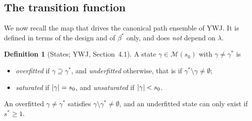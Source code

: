 \documentclass[aos]{imsart}
\DeclarePairedDelimiter{\abs}{\lvert}{\rvert}
\theoremstyle{plain}
\theoremstyle{definition}
\newtheorem{definition}{Definition}[section]
\begin{document}
    \subsection{The transition function}
    \label{sec:G}


    We now recall the map that drives the canonical path ensemble of YWJ. It
    is defined in terms of the design and of $\beta^\ast$ only, and does
    \emph{not} depend on $\lambda$.

    \begin{definition}[States; YWJ, Section~4.1]
        \label{def:states}
        A state $\gamma\in\mathscr{M}(s_0)$ with $\gamma\neq\gamma^{\ast}$ is
        \begin{itemize}[noitemsep,leftmargin=2.2em]
            \item \emph{overfitted} if $\gamma\supseteq\gamma^{\ast}$, and
            \emph{underfitted} otherwise, that is if
            $\gamma^{\ast}\setminus\gamma\neq\emptyset$;
            \item \emph{saturated} if $\abs \gamma=s_0$, and
            \emph{unsaturated} if $\abs \gamma<s_0$.
        \end{itemize}
        An overfitted $\gamma\neq\gamma^\ast$ satisfies
        $\gamma\setminus\gamma^{\ast}\neq\emptyset$, and an underfitted state
        can only exist if $s^{\ast}\geq1$.
    \end{definition}
\end{document}

